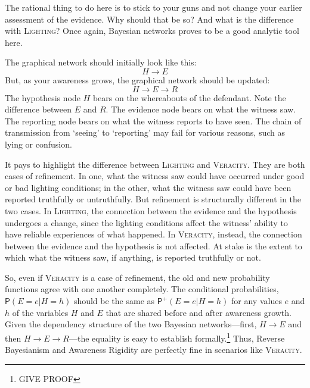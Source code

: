 \documentclass[
  11pt,
  dvipsnames,enabledeprecatedfontcommands]{scrartcl}
\newcommand{\pr}[1]{\ensuremath{\mathsf{P}(#1)}}
\newcommand{\ppr}[2]{\ensuremath{\mathsf{P}^{#1}(#2)}}
\begin{document}
\noindent   The rational thing to do here is to stick to your guns and
not change your earlier assessment of the evidence. Why should that be
so? And what is the difference with \textsc{Lighting}? Once again,
Bayesian networks proves to be a good analytic tool here.

The graphical network should initially look like this:
\[H\rightarrow E\] But, as your awareness grows, the graphical network
should be updated: \[H\rightarrow E \rightarrow R\] The hypothesis node
\(H\) bears on the whereabouts of the defendant. Note the difference
between \(E\) and \(R\). The evidence node bears on what the witness
saw. The reporting node bears on what the witness reports to have seen.
The chain of transmission from `seeing' to `reporting' may fail for
various reasons, such as lying or confusion.

It pays to highlight the difference between \textsc{Lighting} and
\textsc{Veracity}. They are both cases of refinement. In one, what the
witness saw could have occurred under good or bad lighting conditions;
in the other, what the witness saw could have been reported truthfully
or untruthfully. But refinement is structurally different in the two
cases. In \textsc{Lighting}, the connection between the evidence and the
hypothesis undergoes a change, since the lighting conditions affect the
witness' ability to have reliable experiences of what happened. In
\textsc{Veracity}, instead, the connection between the evidence and the
hypothesis is not affected. At stake is the extent to which what the
witness saw, if anything, is reported truthfully or not.

So, even if \textsc{Veracity} is a case of refinement, the old and new
probability functions agree with one another completely. The conditional
probabilities, \(\pr{E=e \vert H=h}\) should be the same as
\(\ppr{+}{E=e \vert H=h}\) for any values \(e\) and \(h\) of the
variables \(H\) and \(E\) that are shared before and after awareness
growth. Given the dependency structure of the two Bayesian
networks---first, \(H\rightarrow E\) and then
\(H\rightarrow E \rightarrow R\)---the equality is easy to establish
formally.\footnote{GIVE PROOF} Thus, Reverse Bayesianism and Awareness
Rigidity are perfectly fine in scenarios like \textsc{Veracity}.
\end{document}

